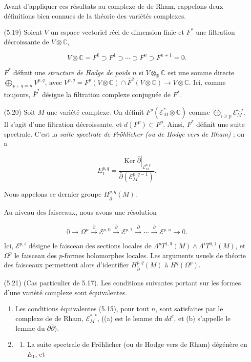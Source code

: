 \documentclass[
  french,
  a3paper,
  a3paper]{extarticle}
\providecommand{\tightlist}{%
  \setlength{\itemsep}{0pt}\setlength{\parskip}{0pt}}
\begin{document}
Avant d'appliquer ces résultats au complexe de de Rham, rappelons deux
définitions bien connues de la théorie des variétés complexes.

(5.19) Soient \(V\) un espace vectoriel réel de dimension finie et
\(F^*\) une filtration décroissante de \(V\otimes\mathbb C\),

\[V\otimes\mathbb C=F^0\supset F^1\supset\cdots\supset F^n\supset F^{n+1}=0.\]

\(F^*\) définit une \emph{structure de Hodge de poids \(n\)} si
\(V\otimes_{\mathbb R}\mathbb C\) est une somme directe
\(\bigoplus_{p+q=n}V^{p,q}\), avec
\(V^{p,q}=F^p(V\otimes\mathbb C)\cap\bar F^q(V\otimes\mathbb C)\longrightarrow V\otimes\mathbb C\).
Ici, comme toujours, \(\bar F^*\) désigne la filtration complexe
conjuguée de \(F^*\).

(5.20) Soit \(M\) une variété complexe. On définit
\(F^p(\mathscr E_M^*\otimes\mathbb C)\) comme
\(\bigoplus_{i\ge p}\mathscr E_M^{i,j}\). Il s'agit d'une filtration
décroissante, et \(d(F^p)\subset F^p\). Ainsi, \(F^*\) définit une suite
spectrale. C'est la \emph{suite spectrale de Fröhlicher (ou de Hodge
vers de Rham)} ; on a

\[E_1^{p,q}=\frac{\left.\operatorname{Ker}\bar\partial\right|_{\mathscr E_M^{p,q}}}{\bar\partial(\mathscr E_M^{p,q-1})}.\]

Nous appelons ce dernier groupe \(H_{\bar\partial}^{p,q}(M)\).

Au niveau des faisceaux, nous avons une résolution

\[0\longrightarrow\Omega^p\xrightarrow{\bar\partial}\mathscr E^{p,0}\xrightarrow{\bar\partial}\mathscr E^{p,1}\xrightarrow{\bar\partial}\cdots\xrightarrow{\bar\partial}\mathscr E^{p,n}\longrightarrow0.\]

Ici, \(\mathscr E^{p,i}\) désigne le faisceau des sections locales de
\(\Lambda^pT^{1,0}(M)\wedge\Lambda^iT^{0,1}(M)\), et \(\Omega^p\) le
faisceau des \(p\)-formes holomorphes locales. Les arguments usuels de
théorie des faisceaux permettent alors d'identifier
\(H_{\bar\partial}^{p,q}(M)\) à \(H^q(\Omega^p)\).

(5.21) (Cas particulier de 5.17). Les conditions suivantes portant sur
les formes d'une variété complexe sont équivalentes.

\begin{enumerate}
\def\labelenumi{(\arabic{enumi})}
\item
  Les conditions équivalentes (5.15), pour tout \(n\), sont satisfaites
  par le complexe de de Rham, \(\mathscr E_M^{*,*}\), ((a) est le lemme
  du \(dd^c\), et (b) s'appelle le lemme du \(\partial\bar\partial\)).
\item
  \begin{enumerate}
  \def\labelenumii{\alph{enumii})}
  \tightlist
  \item
    La suite spectrale de Fröhlicher (ou de Hodge vers de Rham) dégénère
    en \(E_1\), et
  \end{enumerate}
\end{enumerate}
\end{document}
